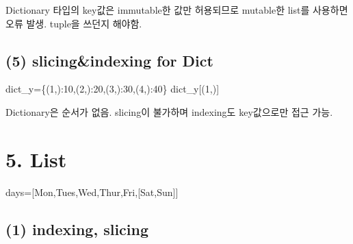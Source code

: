 \documentclass[
  a4paper,
  DIV=11,
  numbers=noendperiod]{scrreprt}
\newenvironment{Shaded}{\begin{snugshade}}{\end{snugshade}}
\newcommand{\DecValTok}[1]{\textcolor[rgb]{0.68,0.00,0.00}{#1}}
\newcommand{\NormalTok}[1]{\textcolor[rgb]{0.00,0.23,0.31}{#1}}
\newcommand{\OperatorTok}[1]{\textcolor[rgb]{0.37,0.37,0.37}{#1}}
\newcommand{\StringTok}[1]{\textcolor[rgb]{0.13,0.47,0.30}{#1}}
\begin{document}
Dictionary 타입의 key값은 immutable한 값만 허용되므로 mutable한 list를
사용하면 오류 발생. tuple을 쓰던지 해야함.

\subsection*{(5) slicing\&indexing for
Dict}\label{slicingindexing-for-dict}

\begin{Shaded}
\begin{Highlighting}[]
\NormalTok{dict\_y}\OperatorTok{=}\NormalTok{\{(}\DecValTok{1}\NormalTok{,):}\DecValTok{10}\NormalTok{,(}\DecValTok{2}\NormalTok{,):}\DecValTok{20}\NormalTok{,(}\DecValTok{3}\NormalTok{,):}\DecValTok{30}\NormalTok{,(}\DecValTok{4}\NormalTok{,):}\DecValTok{40}\NormalTok{\}}
\NormalTok{dict\_y[(}\DecValTok{1}\NormalTok{,)]}
\end{Highlighting}
\end{Shaded}

Dictionary은 순서가 없음. slicing이 불가하며 indexing도 key값으로만 접근
가능.

\section*{5. List}\label{list}


\begin{Shaded}
\begin{Highlighting}[]
\NormalTok{days}\OperatorTok{=}\NormalTok{[}\StringTok{\textquotesingle{}Mon\textquotesingle{}}\NormalTok{,}\StringTok{\textquotesingle{}Tues\textquotesingle{}}\NormalTok{,}\StringTok{\textquotesingle{}Wed\textquotesingle{}}\NormalTok{,}\StringTok{\textquotesingle{}Thur\textquotesingle{}}\NormalTok{,}\StringTok{\textquotesingle{}Fri\textquotesingle{}}\NormalTok{,[}\StringTok{\textquotesingle{}Sat\textquotesingle{}}\NormalTok{,}\StringTok{\textquotesingle{}Sun\textquotesingle{}}\NormalTok{]]}
\end{Highlighting}
\end{Shaded}

\subsection*{(1) indexing, slicing}\label{indexing-slicing}
\end{document}
